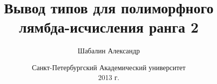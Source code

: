\documentclass{beamer}
\title{Вывод типов для полиморфного лямбда-исчисления ранга 2}
\author{Шабалин Александр}
\institute{{\tiny научный руководитель}\\ \vspace{.10cm}проф. Москвин Д. Н.}
\date{\scriptsize Санкт-Петербургский Академический университет\\ \vspace{.10cm}2013 г.}
\begin{document}
\frame{\titlepage}


\end{document}

